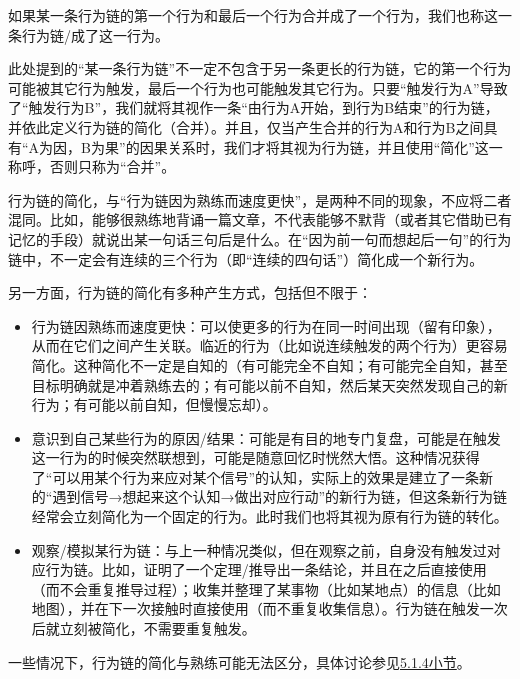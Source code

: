 如果某一条行为链的第一个行为和最后一个行为合并成了一个行为，我们也称这一条行为链/成了这一行为。
\begin{examples}
此处提到的“某一条行为链”不一定不包含于另一条更长的行为链，它的第一个行为可能被其它行为触发，最后一个行为也可能触发其它行为。只要“触发行为A”导致了“触发行为B”，我们就将其视作一条“由行为A开始，到行为B结束”的行为链，并依此定义行为链的简化（合并）。并且，仅当产生合并的行为A和行为B之间具有“A为因，B为果”的因果关系时，我们才将其视为行为链，并且使用“简化”这一称呼，否则只称为“合并”。

行为链的简化，与“行为链因为熟练而速度更快”，是两种不同的现象，不应将二者混同。比如，能够很熟练地背诵一篇文章，不代表能够不默背（或者其它借助已有记忆的手段）就说出某一句话三句后是什么。在“因为前一句而想起后一句”的行为链中，不一定会有连续的三个行为（即“连续的四句话”）简化成一个新行为。

另一方面，行为链的简化有多种产生方式，包括但不限于：
\begin{itemize}
\item 行为链因熟练而速度更快：可以使更多的行为在同一时间出现（留有印象），从而在它们之间产生关联。临近的行为（比如说连续触发的两个行为）更容易简化。这种简化不一定是自知的（有可能完全不自知；有可能完全自知，甚至目标明确就是冲着熟练去的；有可能以前不自知，然后某天突然发现自己的新行为；有可能以前自知，但慢慢忘却）。
\item 意识到自己某些行为的原因/结果：可能是有目的地专门复盘，可能是在触发这一行为的时候突然联想到，可能是随意回忆时恍然大悟。这种情况获得了“可以用某个行为来应对某个信号”的认知，实际上的效果是建立了一条新的“遇到信号→想起来这个认知→做出对应行动”的新行为链，但这条新行为链经常会立刻简化为一个固定的行为。此时我们也将其视为原有行为链的转化。
\item 观察/模拟某行为链：与上一种情况类似，但在观察之前，自身没有触发过对应行为链。比如，证明了一个定理/推导出一条结论，并且在之后直接使用（而不会重复推导过程）；收集并整理了某事物（比如某地点）的信息（比如地图），并在下一次接触时直接使用（而不重复收集信息）。行为链在触发一次后就立刻被简化，不需要重复触发。
\end{itemize}
一些情况下，行为链的简化与熟练可能无法区分，具体讨论参见\hyperref[sec:广义行为与多重触发]{5.1.4小节}。
\end{examples}

